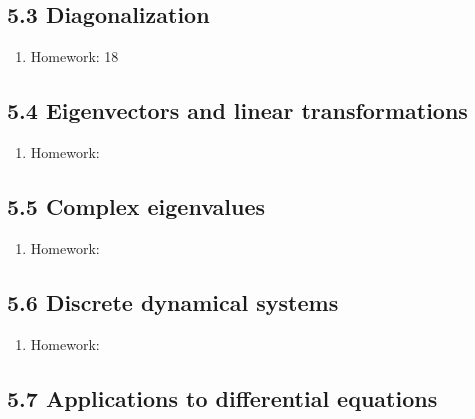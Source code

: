 \documentclass{article}
\begin{document}
\subsection{5.3 Diagonalization}

\begin{enumerate}

\item Homework: 18

\end{enumerate}

\subsection{5.4 Eigenvectors and linear transformations}

\begin{enumerate}

\item Homework: 

\end{enumerate}

\subsection{5.5 Complex eigenvalues}

\begin{enumerate}

\item Homework: 

\end{enumerate}

\subsection{5.6 Discrete dynamical systems}

\begin{enumerate}

\item Homework: 

\end{enumerate}

\subsection{5.7 Applications to differential equations}
\end{document}
